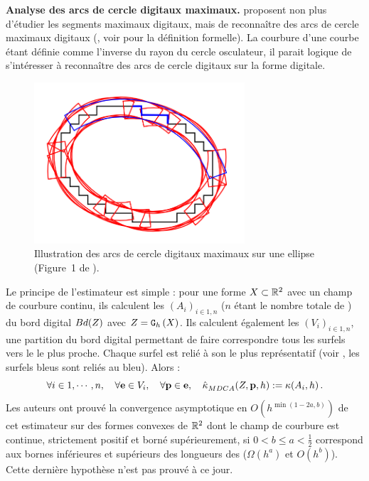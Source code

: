 \noindent\textbf{Analyse des arcs de cercle digitaux maximaux.\quad}
 proposent non plus d'étudier les segments
maximaux digitaux, mais de reconnaître des arcs de cercle maximaux digitaux
(\MDCA, voir  pour la définition
formelle). La courbure d'une courbe étant définie comme l'inverse du rayon du
cercle osculateur, il parait logique de s'intéresser à reconnaître des arcs de
cercle digitaux sur la forme digitale.

\begin{figure}[ht]{
    \begin{center}
    \includegraphics[height=6cm]{images/Notions/MDCA}
    \end{center}}
    \caption[Illustration des arcs de cercle digitaux maximaux sur une ellipse.]
    {Illustration des arcs de cercle digitaux maximaux sur une ellipse (Figure~1
    de \cite{Roussillon2011}).\label{fig:mdca-curv-figure}}
\end{figure}

Le principe de l'estimateur est simple : pour une forme $X \subset \mathbb{R}^2$
avec un champ de courbure continu, ils calculent les $(A_i)_{i \in 1,n}$ \MDCA
($n$ étant le nombre totale de \MDCA) du bord digital $Bd({Z})$ avec
$Z = \mathtt{G}_{h}\left(X\right)$. Ils calculent également les $(V_i)_{i \in 1,n}$, une
partition du bord digital permettant de faire correspondre tous les surfels vers
le \MDCA le plus proche. Chaque surfel est relié à son \MDCA le plus
représentatif (voir , les surfels bleus sont
reliés au \MDCA bleu). Alors :
%
\begin{equation}
    \forall i \in 1,\cdots,n, \quad \forall \mathbf{e} \in V_i, \quad \forall \mathbf{p} \in \mathbf{e},
    \quad \hat{\kappa}^{}_{MDCA}(Z,\mathbf{p},h) := \kappa(A_i,h) \,.
\end{equation}
%
Les auteurs ont prouvé la convergence asymptotique en $O(h^{\min(1-2a,b)})$ de
cet estimateur sur des formes convexes de $\mathbb{R}^2$ dont le champ de courbure est
continue, strictement positif et borné supérieurement, si $0 < b \le a <
\frac{1}{2}$ correspond aux bornes inférieures et supérieurs des longueurs des
\MDCA (\respp $\Omega(h^a)$ et $O(h^b)$). Cette dernière hypothèse n'est pas
prouvé à ce jour.


